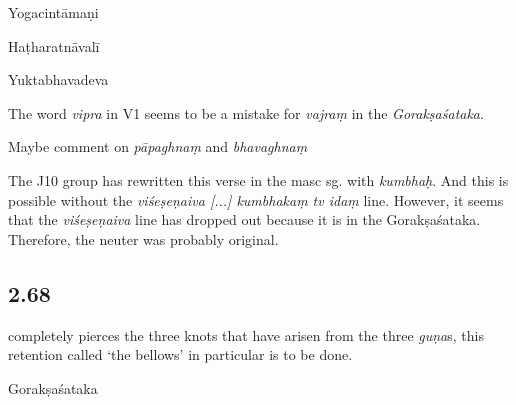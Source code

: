 \begin{ekdosis}
\begin{testimonia}[hp02_067]
Yogacintāmaṇi

\begin{versinnote}
\end{versinnote}

Haṭharatnāvalī

\begin{versinnote}
\end{versinnote}

Yuktabhavadeva

\begin{versinnote}
\end{versinnote}
\end{testimonia}

\begin{philcomm}[hp02_067]
The word \emph{vipra} in V1 seems to be a mistake for \emph{vajraṃ} in the \emph{Gorakṣaśataka}.

Maybe comment on \emph{pāpaghnaṃ} and \emph{bhavaghnaṃ}

The J10 group has rewritten this verse in the masc sg. with \emph{kumbhaḥ}. And this is possible without the \emph{viśeṣeṇaiva [...] kumbhakaṃ tv idaṃ} line. However, it seems that the \emph{viśeṣeṇaiva} line has dropped out because it is in the Gorakṣaśataka. Therefore, the neuter was probably original.
\end{philcomm}

\subsection*{2.68}
\begin{translation}[hp02_068]
[and] completely pierces the three knots that have arisen from the three \emph{guṇa}s, this retention called ‘the bellows’ in particular is to be done.
\end{translation}

\begin{sources}[hp02_068]
Gorakṣaśataka

\begin{versinnote}
\end{versinnote}
\end{sources}


\end{ekdosis}

